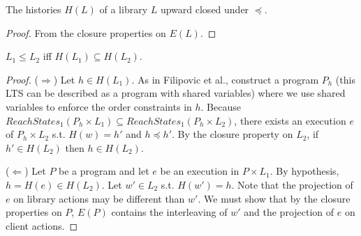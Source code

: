 \begin{lemma}
  
  The histories $H(L)$ of a library $L$ upward closed under $\preceq$.

\end{lemma}

\begin{proof}

  From the closure properties on $E(L)$.

\end{proof}

\begin{theorem}

  $L_1 \leq L_2$ iff $H(L_1) \subseteq H(L_2)$.

\end{theorem}

\begin{proof}

  ($\Rightarrow$) Let $h\in H(L_1)$. As in Filipovic et al., construct a
  program $P_h$ (this LTS can be described as a program with shared variables)
  where we use shared variables to enforce the order constraints in $h$.
  Because $ReachStates_1(P_h\times L_1) \subseteq ReachStates_1(P_h\times
  L_2)$, there exists an execution $e$ of $P_h\times L_2$ s.t. $H(w)=h'$ and
  $h\preceq h'$. By the closure property on $L_2$, if $h'\in H(L_2)$ then $h\in
  H(L_2)$.

  ($\Leftarrow$) Let $P$ be a program and let $e$ be an execution in $P\times
  L_1$. By hypothesis, $h=H(e)\in H(L_2)$. Let $w'\in L_2$ s.t. $H(w')=h$. Note
  that the projection of $e$ on library actions may be different than $w'$. We
  must show that by the closure properties on $P$, $E(P)$ contains the
  interleaving of $w'$ and the projection of $e$ on client actions.

\end{proof}
